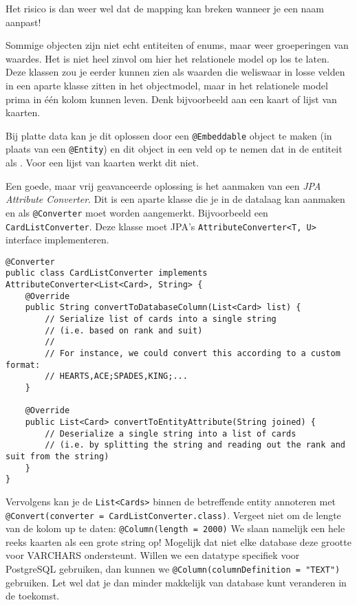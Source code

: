 Het risico is dan weer wel dat de 
mapping kan breken wanneer je een naam aanpast!

Sommige objecten zijn niet echt entiteiten of enums, maar weer 
groeperingen van waardes. Het is niet heel zinvol om hier 
het relationele model op los te laten. Deze klassen zou je 
eerder kunnen zien als waarden die weliswaar in losse velden 
in een aparte klasse zitten in het objectmodel, maar in het 
relationele model prima in één kolom kunnen leven.
Denk bijvoorbeeld aan een kaart of lijst van kaarten.

Bij platte data kan je dit oplossen door een 
\texttt{@Embeddable} object te maken (in plaats van een 
\texttt{@Entity}) en dit object in een  
veld op te nemen dat in de entiteit als .
Voor een lijst van kaarten werkt dit niet.

Een goede, maar vrij geavanceerde oplossing is het aanmaken 
van een \textit{JPA Attribute Converter}. Dit is een aparte 
klasse die je in de datalaag kan aanmaken en als \texttt{@Converter}
moet worden aangemerkt. Bijvoorbeeld een \texttt{CardListConverter}.
Deze klasse moet JPA's \texttt{AttributeConverter<T, U>}
interface implementeren.

\begin{verbatim}
@Converter
public class CardListConverter implements AttributeConverter<List<Card>, String> {
    @Override
    public String convertToDatabaseColumn(List<Card> list) {
        // Serialize list of cards into a single string 
        // (i.e. based on rank and suit)
        //
        // For instance, we could convert this according to a custom format: 
        // HEARTS,ACE;SPADES,KING;...
    }

    @Override
    public List<Card> convertToEntityAttribute(String joined) {
        // Deserialize a single string into a list of cards
        // (i.e. by splitting the string and reading out the rank and suit from the string)
    }
}
\end{verbatim}

Vervolgens kan je de \texttt{List<Cards>} binnen de betreffende entity
annoteren met \texttt{@Convert(converter = CardListConverter.class)}.
Vergeet niet om de lengte van de kolom up te daten:
\texttt{@Column(length = 2000)}
We slaan namelijk een hele reeks kaarten als een grote string op!
Mogelijk dat niet elke database deze grootte voor VARCHARS ondersteunt.
Willen we een datatype specifiek voor PostgreSQL gebruiken,
dan kunnen we \texttt{@Column(columnDefinition = "TEXT")}
gebruiken. Let wel dat je dan minder makkelijk van database kunt veranderen
in de toekomst.

